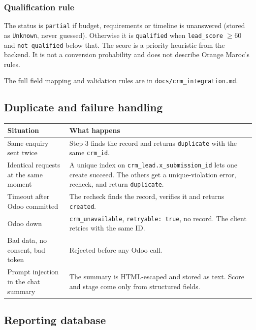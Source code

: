 \documentclass[11pt,a4paper]{article}
\newcommand{\f}[1]{\texttt{#1}}
\begin{document}
\subsubsection*{Qualification rule}

The status is \f{partial} if budget, requirements or timeline is unanswered (stored as
\f{Unknown}, never guessed). Otherwise it is \f{qualified} when \f{lead\_score} $\geq 60$ and
\f{not\_qualified} below that. The score is a priority heuristic from the backend. It is not a
conversion probability and does not describe Orange Maroc's rules.

The full field mapping and validation rules are in \f{docs/crm\_integration.md}.

\subsection{Duplicate and failure handling}

\begin{tabularx}{\textwidth}{>{\raggedright\arraybackslash}p{4.6cm}Y}
  \toprule
  \textbf{Situation} & \textbf{What happens} \\
  \midrule
  Same enquiry sent twice & Step 3 finds the record and returns \f{duplicate} with the same \f{crm\_id}. \\
  Identical requests at the same moment & A unique index on \f{crm\_lead.x\_submission\_id} lets one create succeed. The others get a unique-violation error, recheck, and return \f{duplicate}. \\
  Timeout after Odoo committed & The recheck finds the record, verifies it and returns \f{created}. \\
  Odoo down & \f{crm\_unavailable}, \f{retryable: true}, no record. The client retries with the same ID. \\
  Bad data, no consent, bad token & Rejected before any Odoo call. \\
  Prompt injection in the chat summary & The summary is HTML-escaped and stored as text. Score and stage come only from structured fields. \\
  \bottomrule
\end{tabularx}

\subsection{Reporting database}\label{sec:db}
\end{document}

